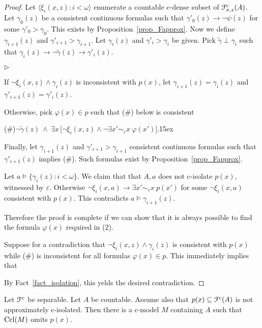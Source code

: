 \documentclass{amsproc}
\newcommand{\mylabel}[1]{{#1}\hfill}
\renewenvironment{itemize}
  {\begin{list}{$\triangleright$}{%
  \setlength{\parskip}{0mm}
  \setlength{\topsep}{.4\baselineskip}
  \setlength{\rightmargin}{0mm}
  \setlength{\listparindent}{0mm}
  \setlength{\itemindent}{0mm}
  \setlength{\labelwidth}{3ex}
  \setlength{\itemsep}{.2\baselineskip}
  \setlength{\parsep}{.2\baselineskip}
  \setlength{\partopsep}{0mm}
  \setlength{\labelsep}{1ex}
  \setlength{\leftmargin}{\labelwidth+\labelsep}
  \let\makelabel\mylabel}}{%
\end{list}}
\begin{document}
{\begin{proof}
  Let $\langle\xi_i(x,z):i<\omega\rangle$ enumerate a countable c-dense subset of ${\EuScript F}^{\rm c}_{x,z}(A)$.
  Let $\gamma_0(z)$ be a consistent continuous formulas such that $\gamma'_0(z)\rightarrow\neg\psi(z)$ for some $\gamma'_0>\gamma_0$.
  This exists by Proposition~\ref{prop_Fapprox}.
  Now we define $\gamma_{i+1}(z)$ and $\gamma'_{i+1}>\gamma_{i+1}$.
  Let $\gamma_i(z)$ and $\gamma'_i>\gamma_i$ be given.
  Pick $\tilde{\gamma}\perp\gamma_i$ such that $\gamma_i(z)\rightarrow\neg\tilde{\gamma}(z)\rightarrow\gamma'_i(z)$.
  
  \begin{itemize}
  \item[1.] If $\neg\xi_i(x,z)\wedge\gamma_i(z)$ is inconsistent with $p(x)$, let $\gamma_{i+1}(z)=\gamma_i(z)$ and  $\gamma'_{i+1}(z)=\gamma'_i(z)$.
  \item[2.] Otherwise, pick $\varphi(x)\in p$ such that (\#) below is consistent
  
  (\#)\hfil $\neg\tilde{\gamma}(z)\ \wedge\ \exists x\,\big[\neg\xi_i(x,z)\wedge\neg\exists x'\sim_\varepsilon x\ \varphi(x')\big].$\kern15ex
  
  Finally, let $\gamma_{i+1}(z)$ and $\gamma'_{i+1}>\gamma_{i+1}$ consistent continuous formulas such that $\gamma'_{i+1}(z)$ implies (\#).
  Such formulas exist by Proposition~\ref{prop_Fapprox}.
  \end{itemize}
  
  Let $a\models\{\gamma_i(z):i<\omega\}$.
  We claim that that $A,a$ does not c-isolate $p(x)$, witnessed by $\varepsilon$.
  Otherwise $\neg\xi_i(x,a)\rightarrow\exists x'\sim_\varepsilon x\  p(x')$ for some $\neg\xi_i(x,a)$ consistent with $p(x)$.
  This contradicts $a\models\gamma_{i+1}(z)$.
  
  Therefore the proof is complete if we can show that it is always possible to find the formula $\varphi(x)$ required in (2).
  
  Suppose for a contradiction that $\neg\xi_i(x,z)\wedge\gamma_i(z)$ is consistent with $p(x)$ while (\#) is inconsistent for all formulas $\varphi(x)\in p$.
  This immediately implies that 
  
  
  By Fact~\ref{fact_isolation}, this yelds the desired contradiction.
\end{proof}

\begin{theorem}\label{thm_cOTT}
  Let ${\EuScript F}^{\rm c}$ be separable.
  Let $A$ be countable.
  Assume also that $p(x)\subseteq{\EuScript F}^{\rm c}(A)$ is not approximately c-isolated.
  Then there is a c-model $M$ containing $A$ such that ${\rm Ccl}(M)$ omits $p(x)$. 
\end{theorem}

}
\end{document}

